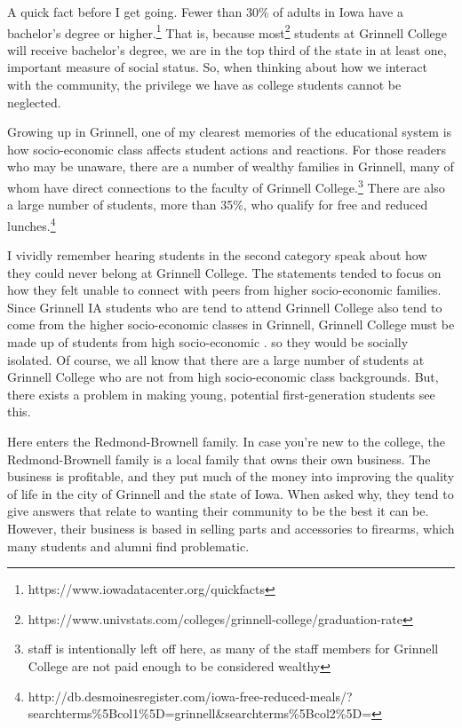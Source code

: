 \documentclass[12pt]{article}[titlepage]
\newcommand{\1}{\={a}}
\newcommand{\2}{\={e}}
\newcommand{\3}{\={\i}}
\newcommand{\4}{\=o}
\newcommand{\5}{\=u}
\newcommand{\6}{\={A}}
\renewcommand{\,}{\textsuperscript{,}}
\begin{document}
A quick fact before I get going.
Fewer than 30\% of adults in Iowa have a bachelor's degree or higher.\footnote{https://www.iowadatacenter.org/quickfacts}
That is, because most\footnote{https://www.univstats.com/colleges/grinnell-college/graduation-rate} students at Grinnell College will receive bachelor's degree, we are in the top third of the state in at least one, important measure of social status.
So, when thinking about how we interact with the community, the privilege we have as college students cannot be neglected.

Growing up in Grinnell, one of my clearest memories of the educational system is how socio-economic class affects student actions and reactions.
For those readers who may be unaware, there are a number of wealthy families in Grinnell, many of whom have direct connections to the faculty of Grinnell College.\footnote{staff is intentionally left off here, as many of the staff members for Grinnell College are not paid enough to be considered wealthy}
There are also a large number of students, more than 35\%, who qualify for free and reduced lunches.\footnote{http://db.desmoinesregister.com/iowa-free-reduced-meals/?searchterms\%5Bcol1\%5D=grinnell&searchterms\%5Bcol2\%5D=}

I vividly remember hearing students in the second category speak about how they could never belong at Grinnell College.
The statements tended to focus on how they felt unable to connect with peers from higher socio-economic families.
Since Grinnell IA students who are tend to attend Grinnell College also tend to come from the higher socio-economic classes in Grinnell, Grinnell College must be made up of students from high socio-economic .
 so they would be socially isolated.
Of course, we all know that there are a large number of students at Grinnell College who are not from high socio-economic class backgrounds.
But, there exists a problem in making young, potential first-generation students see this.

Here enters the Redmond-Brownell family.
In case you're new to the college, the Redmond-Brownell family is a local family that owns their own business.
The business is profitable, and they put much of the money into improving the quality of life in the city of Grinnell and the state of Iowa.
When asked why, they tend to give answers that relate to wanting their community to be the best it can be.
However, their business is based in selling parts and accessories to firearms, which many students and alumni find problematic.
\end{document}

